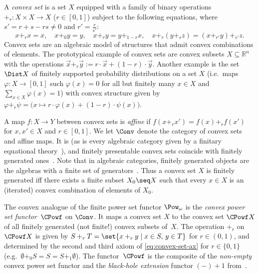 A \emph{convex set} is a set \(X\) equipped with a family of binary operations \( +_{r}  \colon X \times X \rightarrow X\) (\(r \in [0, 1]\)) subject to the following equations, where \(s' = r + s -rs \ne 0\) and \(r' = \frac{r}{s'}\): 
  \begin{equation}\label{eq:convex-set-ax} x +_{r} x = x,
    \quad
    x +_{0} y = y,
    \quad
    x +_{r} y = y +_{1-r} x,
    \quad
    x +_{r} (y +_{s} z) = (x +_{r'} y ) +_{s'} z.
  \end{equation}
Convex sets are an algebraic model of structures that admit convex combinations of elements. The prototypical example of convex sets are convex subsets $X\subseteq \mathbb{R}^n$ with the operations $\vec x +_r \vec y := r\cdot \vec x
+ (1-r)\cdot \vec y$. Another example is the set $\Dist X$ of finitely supported probability distributions on a set $X$ (i.e.\ maps $\varphi\colon X\to [0,1]$ such $\varphi(x)=0$ for all but finitely many $x\in X$ and $\sum_{x\in X} \varphi(x) = 1$) with convex structure given by $\varphi+_r \psi = \big(x \mapsto r \cdot \varphi(x) + (1-r) \cdot \psi(x)\big)$.

 A map \(f \colon X \rightarrow Y\) between convex sets    is \emph{affine} if \(f(x +_{r} x') = f(x) +_{r} f(x')\) for \(x, x' \in X\) and \(r \in [0, 1]\). We let $\Conv$ denote the category of convex sets and affine maps. It is \lfp (as is every algebraic category given by a finitary equational theory~\cite{adamek_rosicky_1994}), and finitely presentable convex sets coincide with finitely generated ones~\cite[Cor.~5.5]{sw15}. Note that in algebraic categories, finitely generated objects are the algebras with a finite set of generators~\cite[Ex.~1.68]{adamek_rosicky_1994}. Thus a convex set $X$ is finitely generated iff there exists a finite subset $X_0\seq X$ such that every $x\in X$ is an (iterated) convex combination of elements of $X_0$. 

The convex analogue of the finite power set functor $\Pow_\omega$ is the \emph{convex power set functor}~$\CPowf$ on $\Conv$. It maps a convex set $X$ to the convex set $\CPowf X$ of all finitely generated (not finite!) convex subsets of~$X$. The operation $+_r$ on $\CPowf X$ is given by $S+_r T = \set{x+_r y \mid x\in S,\, y\in T}$ for $r\in (0,1)$, and determined by the second and third axiom of \eqref{eq:convex-set-ax} for $r\in \{0,1\}$ (e.g.\ $\emptyset +_0 S = S = S+_1 \emptyset$). The functor~$\CPowf$ is the composite of the \emph{non-empty} convex power set functor and the \emph{black-hole extension} functor $(-)+1$ from~\cite[Sec.~5]{bss17}.


